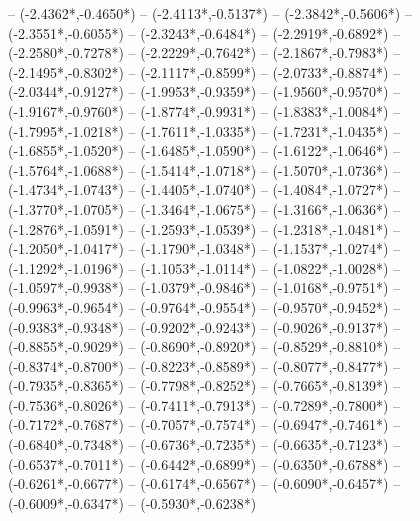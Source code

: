{	-- ({-2.4362*\dx},{-0.4650*\dy})
	-- ({-2.4113*\dx},{-0.5137*\dy})
	-- ({-2.3842*\dx},{-0.5606*\dy})
	-- ({-2.3551*\dx},{-0.6055*\dy})
	-- ({-2.3243*\dx},{-0.6484*\dy})
	-- ({-2.2919*\dx},{-0.6892*\dy})
	-- ({-2.2580*\dx},{-0.7278*\dy})
	-- ({-2.2229*\dx},{-0.7642*\dy})
	-- ({-2.1867*\dx},{-0.7983*\dy})
	-- ({-2.1495*\dx},{-0.8302*\dy})
	-- ({-2.1117*\dx},{-0.8599*\dy})
	-- ({-2.0733*\dx},{-0.8874*\dy})
	-- ({-2.0344*\dx},{-0.9127*\dy})
	-- ({-1.9953*\dx},{-0.9359*\dy})
	-- ({-1.9560*\dx},{-0.9570*\dy})
	-- ({-1.9167*\dx},{-0.9760*\dy})
	-- ({-1.8774*\dx},{-0.9931*\dy})
	-- ({-1.8383*\dx},{-1.0084*\dy})
	-- ({-1.7995*\dx},{-1.0218*\dy})
	-- ({-1.7611*\dx},{-1.0335*\dy})
	-- ({-1.7231*\dx},{-1.0435*\dy})
	-- ({-1.6855*\dx},{-1.0520*\dy})
	-- ({-1.6485*\dx},{-1.0590*\dy})
	-- ({-1.6122*\dx},{-1.0646*\dy})
	-- ({-1.5764*\dx},{-1.0688*\dy})
	-- ({-1.5414*\dx},{-1.0718*\dy})
	-- ({-1.5070*\dx},{-1.0736*\dy})
	-- ({-1.4734*\dx},{-1.0743*\dy})
	-- ({-1.4405*\dx},{-1.0740*\dy})
	-- ({-1.4084*\dx},{-1.0727*\dy})
	-- ({-1.3770*\dx},{-1.0705*\dy})
	-- ({-1.3464*\dx},{-1.0675*\dy})
	-- ({-1.3166*\dx},{-1.0636*\dy})
	-- ({-1.2876*\dx},{-1.0591*\dy})
	-- ({-1.2593*\dx},{-1.0539*\dy})
	-- ({-1.2318*\dx},{-1.0481*\dy})
	-- ({-1.2050*\dx},{-1.0417*\dy})
	-- ({-1.1790*\dx},{-1.0348*\dy})
	-- ({-1.1537*\dx},{-1.0274*\dy})
	-- ({-1.1292*\dx},{-1.0196*\dy})
	-- ({-1.1053*\dx},{-1.0114*\dy})
	-- ({-1.0822*\dx},{-1.0028*\dy})
	-- ({-1.0597*\dx},{-0.9938*\dy})
	-- ({-1.0379*\dx},{-0.9846*\dy})
	-- ({-1.0168*\dx},{-0.9751*\dy})
	-- ({-0.9963*\dx},{-0.9654*\dy})
	-- ({-0.9764*\dx},{-0.9554*\dy})
	-- ({-0.9570*\dx},{-0.9452*\dy})
	-- ({-0.9383*\dx},{-0.9348*\dy})
	-- ({-0.9202*\dx},{-0.9243*\dy})
	-- ({-0.9026*\dx},{-0.9137*\dy})
	-- ({-0.8855*\dx},{-0.9029*\dy})
	-- ({-0.8690*\dx},{-0.8920*\dy})
	-- ({-0.8529*\dx},{-0.8810*\dy})
	-- ({-0.8374*\dx},{-0.8700*\dy})
	-- ({-0.8223*\dx},{-0.8589*\dy})
	-- ({-0.8077*\dx},{-0.8477*\dy})
	-- ({-0.7935*\dx},{-0.8365*\dy})
	-- ({-0.7798*\dx},{-0.8252*\dy})
	-- ({-0.7665*\dx},{-0.8139*\dy})
	-- ({-0.7536*\dx},{-0.8026*\dy})
	-- ({-0.7411*\dx},{-0.7913*\dy})
	-- ({-0.7289*\dx},{-0.7800*\dy})
	-- ({-0.7172*\dx},{-0.7687*\dy})
	-- ({-0.7057*\dx},{-0.7574*\dy})
	-- ({-0.6947*\dx},{-0.7461*\dy})
	-- ({-0.6840*\dx},{-0.7348*\dy})
	-- ({-0.6736*\dx},{-0.7235*\dy})
	-- ({-0.6635*\dx},{-0.7123*\dy})
	-- ({-0.6537*\dx},{-0.7011*\dy})
	-- ({-0.6442*\dx},{-0.6899*\dy})
	-- ({-0.6350*\dx},{-0.6788*\dy})
	-- ({-0.6261*\dx},{-0.6677*\dy})
	-- ({-0.6174*\dx},{-0.6567*\dy})
	-- ({-0.6090*\dx},{-0.6457*\dy})
	-- ({-0.6009*\dx},{-0.6347*\dy})
	-- ({-0.5930*\dx},{-0.6238*\dy})
}
